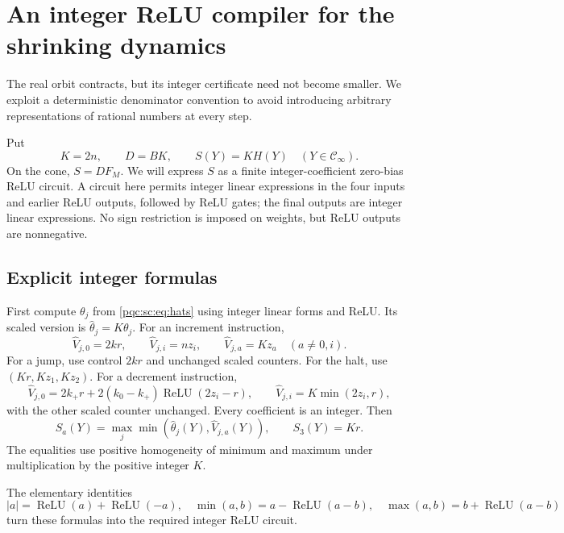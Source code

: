 \documentclass[11pt,letterpaper]{article}
\numberwithin{equation}{section}
\theoremstyle{definition}
\theoremstyle{remark}
\newcommand{\srcmark}[1]{\par\noindent{\small\itshape [source~#1]}\par}
\newcommand{\ReLU}{\operatorname{ReLU}}
\newcommand{\Cinf}{\mathcal C_{\infty}}
\begin{document}
\section{An integer ReLU compiler for the shrinking dynamics}
\label{pqc:sc:sec:integer}
\srcmark{14}

The real orbit contracts, but its integer certificate need not become
smaller. We exploit a deterministic denominator convention to avoid
introducing arbitrary representations of rational numbers at every step.

Put
\begin{equation}\label{pqc:sc:eq:KD}
 K=2n,\qquad D=BK,\qquad S(Y)=K H(Y)\quad(Y\in\Cinf).
\end{equation}
On the cone, $S=D F_M$. We will express $S$ as a finite integer-coefficient
zero-bias ReLU circuit. A circuit here permits integer linear expressions in
the four inputs and earlier ReLU outputs, followed by ReLU gates; the final
outputs are integer linear expressions. No sign restriction is imposed on
weights, but ReLU outputs are nonnegative.

\subsection{Explicit integer formulas}

First compute $\theta_j$ from \eqref{pqc:sc:eq:hats} using integer linear forms and
ReLU. Its scaled version is $\widehat\theta_j=K\theta_j$.
For an increment instruction,
\[
 \widehat V_{j,0}=2kr,\qquad
 \widehat V_{j,i}=nz_i,\qquad
 \widehat V_{j,a}=Kz_a\quad(a\ne0,i).
\]
For a jump, use control $2kr$ and unchanged scaled counters.
For the halt, use $(Kr,Kz_1,Kz_2)$.
For a decrement instruction,
\begin{equation}\label{pqc:sc:eq:int-dec}
 \widehat V_{j,0}=2k_+r+2(k_0-k_+)\ReLU(2z_i-r),\qquad
 \widehat V_{j,i}=K\min(2z_i,r),
\end{equation}
with the other scaled counter unchanged. Every coefficient is an integer.
Then
\begin{equation}\label{pqc:sc:eq:int-S}
 S_a(Y)=\max_j\min(\widehat\theta_j(Y),\widehat V_{j,a}(Y)),
 \qquad S_3(Y)=Kr.
\end{equation}
The equalities use positive homogeneity of minimum and maximum under
multiplication by the positive integer $K$.

The elementary identities
\begin{equation}\label{pqc:sc:eq:relu-identities}
 |a|=\ReLU(a)+\ReLU(-a),\quad
 \min(a,b)=a-\ReLU(a-b),\quad
 \max(a,b)=b+\ReLU(a-b)
\end{equation}
turn these formulas into the required integer ReLU circuit.
\end{document}

